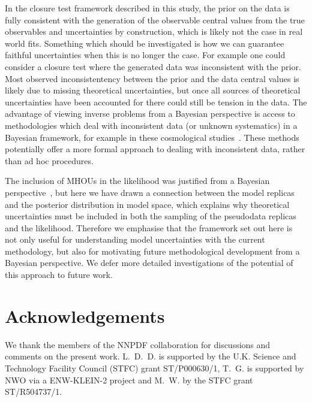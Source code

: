 In the closure test framework described in this study, the prior on the data is
fully consistent with the generation of the observable central values from the
true observables and uncertainties by construction, which is likely not the case
in real world fits. Something which should be investigated is how we can
guarantee faithful uncertainties when this is no longer the case. For example
one could consider a closure test where the generated data was inconsistent with
the prior. Most observed inconsistentency between the prior and the data central
values is likely due to missing theoretical uncertainties, but once all sources
of theoretical uncertainties have been accounted for there could still be
tension in the data. The advantage of viewing inverse problems from a Bayesian
perspective is access to methodologies which deal with inconsistent data (or
unknown systematics) in a Bayesian framework, for example in these cosmological
studies~\cite{Luis_Bernal_2018, Hobson_2002}. These methods potentially offer a
more formal approach to dealing with inconsistent data, rather than ad hoc
procedures.

The inclusion of MHOUs in the likelihood was justified from a Bayesian
perspective~\cite{AbdulKhalek:2019ihb}, but here we have drawn a connection
between the model replicas and the posterior distribution in model space, which
explains why theoretical uncertainties must be included in both the sampling of
the pseudodata replicas and the likelihood. Therefore we emphasise that the
framework set out here is not only useful for understanding model uncertainties
with the current methodology, but also for motivating future methodological
development from a Bayesian perspective. We defer more detailed investigations
of the potential of this approach to future work. 

\section*{Acknowledgements}
We thank the members of the NNPDF collaboration for discussions and comments on the present work. 
L.~D.~D. is supported by the U.K. Science and Technology Facility Council
(STFC) grant ST/P000630/1, T.~G. is supported by NWO via a ENW-KLEIN-2 project and
M.~W. by the STFC grant ST/R504737/1.
